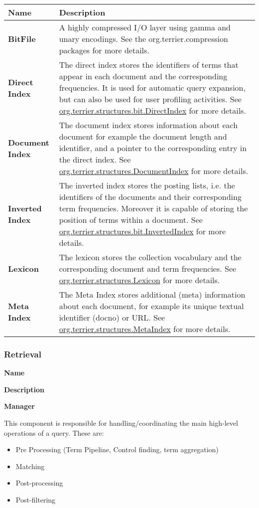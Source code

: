\begin{longtable}[]{@{}ll@{}}
\toprule
\textbf{Name} & \textbf{Description}\tabularnewline
\midrule
\endhead
\textbf{BitFile} & A highly compressed I/O layer using gamma and unary
encodings. See the org.terrier.compression packages for more
details.\tabularnewline
\textbf{Direct Index} & The direct index stores the identifiers of terms
that appear in each document and the corresponding frequencies. It is
used for automatic query expansion, but can also be used for user
profiling activities. See
\href{javadoc/org/terrier/structures/bit/DirectIndex.html}{org.terrier.structures.bit.DirectIndex}
for more details.\tabularnewline
\textbf{Document Index} & The document index stores information about
each document for example the document length and identifier, and a
pointer to the corresponding entry in the direct index. See
\href{javadoc/org/terrier/structures/DocumentIndex.html}{org.terrier.structures.DocumentIndex}
for more details.\tabularnewline
\textbf{Inverted Index} & The inverted index stores the posting lists,
i.e. the identifiers of the documents and their corresponding term
frequencies. Moreover it is capable of storing the position of terms
within a document. See
\href{javadoc/org/terrier/structures/bit/InvertedIndex.html}{org.terrier.structures.bit.InvertedIndex}
for more details.\tabularnewline
\textbf{Lexicon} & The lexicon stores the collection vocabulary and the
corresponding document and term frequencies. See
\href{javadoc/org/terrier/structures/Lexicon.html}{org.terrier.structures.Lexicon}
for more details.\tabularnewline
\textbf{Meta Index} & The Meta Index stores additional (meta)
information about each document, for example its unique textual
identifier (docno) or URL. See
\href{javadoc/org/terrier/structures/MetaIndex.html}{org.terrier.structures.MetaIndex}
for more details.\tabularnewline
\bottomrule
\end{longtable}

\subsubsection{Retrieval}\label{retrieval-1}

\textbf{Name}

\textbf{Description}

\textbf{Manager}

This component is responsible for handling/coordinating the main
high-level operations of a query. These are:

\begin{itemize}
\tightlist
\item
  Pre Processing (Term Pipeline, Control finding, term aggregation)
\item
  Matching
\item
  Post-processing
\item
  Post-filtering
\end{itemize}

